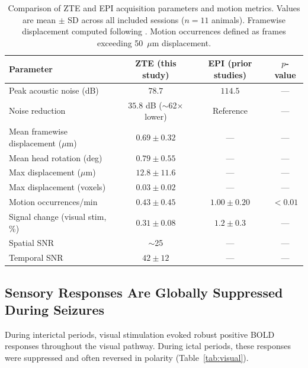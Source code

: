 \documentclass[11pt]{article}
\begin{document}
\begin{table}[H]
\centering
\caption{Comparison of ZTE and EPI acquisition parameters and motion metrics. Values are mean $\pm$ SD across all included sessions ($n = 11$ animals). Framewise displacement computed following \citet{power2012spurious}. Motion occurrences defined as frames exceeding 50~$\mu$m displacement.}
\label{tab:zte_params}
\begin{tabular}{lccc}
\toprule
\textbf{Parameter} & \textbf{ZTE (this study)} & \textbf{EPI (prior studies)} & \textbf{$p$-value} \\
\midrule
Peak acoustic noise (dB) & $78.7$ & $114.5$ & --- \\
Noise reduction & $35.8$ dB ($\sim$62$\times$ lower) & Reference & --- \\
Mean framewise displacement ($\mu$m) & $0.69 \pm 0.32$ & --- & --- \\
Mean head rotation (deg) & $0.79 \pm 0.55$ & --- & --- \\
Max displacement ($\mu$m) & $12.8 \pm 11.6$ & --- & --- \\
Max displacement (voxels) & $0.03 \pm 0.02$ & --- & --- \\
Motion occurrences/min & $0.43 \pm 0.45$ & $1.00 \pm 0.20$ & $< 0.01$ \\
Signal change (visual stim, \%) & $0.31 \pm 0.08$ & $1.2 \pm 0.3$ & --- \\
Spatial SNR & $\sim$25 & --- & --- \\
Temporal SNR & $42 \pm 12$ & --- & --- \\
\bottomrule
\end{tabular}
\end{table}

\subsection{Sensory Responses Are Globally Suppressed During Seizures}

During interictal periods, visual stimulation evoked robust positive BOLD responses throughout the visual pathway. During ictal periods, these responses were suppressed and often reversed in polarity (Table~\ref{tab:visual}).
\end{document}
